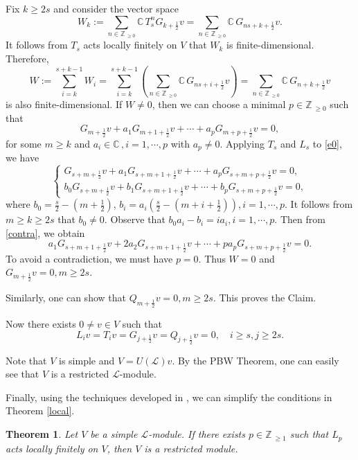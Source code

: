 \documentclass[12pt]{article}
\def\ssc{\scriptscriptstyle}
\def\Z{\mathbb{Z}{\ssc\,}}
\def\C{\mathbb{C}{\ssc\,}}
\numberwithin{equation}{section}
\newtheorem{theo}{Theorem}[section]
\begin{document}
Fix $k\ge 2s$ and consider the vector space
$$W_k:=\sum\limits_{n\in\Z_{\ge 0}}\C T^n_sG_{k+\frac{1}{2}}v=\sum\limits_{n\in\Z_{\ge 0}}\C G_{ns+k+\frac{1}{2}}v.$$
It follows from  $T_s$ acts locally finitely on $V$ that  $W_k$ is finite-dimensional. Therefore,
$$W:=\sum\limits_{i=k}^{s+k-1}W_i=\sum\limits_{i=k}^{s+k-1}\left(\sum\limits_{n\in\Z_{\ge 0}}\C G_{ns+i+\frac{1}{2}}v\right)=\sum\limits_{n\in\Z_{\ge 0}}\C G_{n+k+\frac{1}{2}}v$$
is also finite-dimensional.  If $W\ne 0$,
then we can choose a minimal $p\in\Z_{\ge 0}$ such that
\begin{equation}\label{e0}G_{m+\frac{1}{2}}v+a_1G_{m+1+\frac{1}{2}}v+\cdots +a_pG_{m+p+\frac{1}{2}}v=0,\end{equation}
for some $m\ge k$ and $a_i\in\C, i=1,\cdots,p$ with $a_p\ne 0$.
Applying $T_s$ and $L_s$ to \eqref{e0}, we have
\begin{equation}\label{contra}\left\{\begin{array}{l}
G_{s+m+\frac{1}{2}}v+a_1G_{s+m+1+\frac{1}{2}}v+\cdots +a_pG_{s+m+p+\frac{1}{2}}v=0,\\
b_0G_{s+m+\frac{1}{2}}v+b_1G_{s+m+1+\frac{1}{2}}v+\cdots +b_pG_{s+m+p+\frac{1}{2}}v=0,\end{array}
\right.
\end{equation}
where $b_0=\frac{s}{2}-(m+\frac{1}{2})$, $b_i=a_i\left(\frac{s}{2}-(m+i+\frac{1}{2})\right),i=1,\cdots,p.$  It  follows from  $m\ge k\ge 2s$ that $b_0\ne 0$. Observe that $b_0a_i-b_i=ia_i, i=1,\cdots,p.$ Then from \eqref{contra}, we obtain
$$a_1G_{s+m+1+\frac{1}{2}}v+2a_2G_{s+m+1+\frac{1}{2}}v+\cdots +pa_pG_{s+m+p+\frac{1}{2}}v=0.$$
To avoid  a contradiction, we must have $p=0$. Thus $W=0$ and  $G_{m+\frac{1}{2}}v=0, m\ge 2s.$

Similarly, one can show that $Q_{m+\frac{1}{2}}v=0, m\ge 2s.$    This proves the Claim.


Now there exists  $0\ne v\in V$ such that
$$L_iv=T_iv=G_{j+\frac{1}{2}}v=Q_{j+\frac{1}{2}}v=0,\quad i\ge s, j\ge 2s.$$

Note that $V$ is simple and $V=U(\mathcal{L})v$. By the PBW Theorem, one can easily see that $V$ is a restricted $\mathcal{L}$-module.

Finally, using the techniques developed in \cite{MNTZ}, we can simplify the conditions in Theorem \ref{local}.

\begin{theo}\label{last} Let $V$ be a simple $\mathcal{L}$-module. If there exists $p\in\Z_{\ge 1}$ such that $L_p$ acts locally finitely on $V$, then $V$ is a restricted module.
\end{theo}
\end{document}
